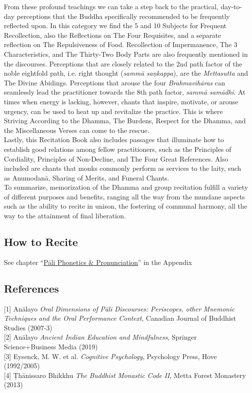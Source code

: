 From these profound teachings we can take a step back to the practical, day-to-day perceptions that the Buddha specifically recommended to be frequently reflected upon. In this category we find the 5 and 10 Subjects for Frequent Recollection, also the Reflections on The Four Requisites, and a separate reflection on The Repulsiveness of Food. Recollection of Impermanence, The 3 Characteristics, and The Thirty-Two Body Parts are also frequently mentioned in the discourses. Perceptions that are closely related to the 2nd path factor of the noble eightfold path, i.e. right thought (\textit{sammā saṇkappa}), are the \textit{Mettasutta} and The Divine Abidings. Perceptions that arouse the four \textit{Brahmavihāras} can seamlessly lead the practitioner towards the 8th path factor, \textit{sammā samādhi}. At times when energy is lacking, however, chants that inspire, motivate, or arouse urgency, can be used to heat up and revitalize the practice. This is where Striving According to the Dhamma, The Burdens, Respect for the Dhamma, and the Miscellaneous Verses can come to the rescue.\\

Lastly, this Recitation Book also includes passages that illuminate how to establish good relations among fellow practitioners, such as the Principles of Cordiality, Principles of Non-Decline, and The Four Great References. Also included are chants that monks commonly perform as services to the laity, such as Anumodanā, Sharing of Merits, and Funeral Chants.\\

To summarize, memorization of the Dhamma and group recitation fulfill a variety of different purposes and benefits, ranging all the way from the mundane aspects such as the ability to recite in unison, the fostering of communal harmony, all the way to the attainment of final liberation.\\

\subsection*{How to Recite}

See chapter ``\hyperref[phonetics]{Pāli Phonetics \& Pronunciation}'' in the Appendix\\

\subsection*{References}
[1] Anālayo \textit{Oral Dimensions of Pāli Discourses: Periscopes, other Mnemonic Techniques and the Oral Performance Context}, Canadian Journal of Buddhist Studies (2007-3)\\

[2] Anālayo \textit{Ancient Indian Education and Mindfulness}, Springer Science+Business Media (2019)\\

[3] Eysenck, M. W. et al. \textit{Cognitive Psychology}, Psychology Press, Hove (1992/2005)\\

[4] Ṭhānissaro Bhikkhu \textit{The Buddhist Monastic Code II}, Metta Forest Monastery (2013)
